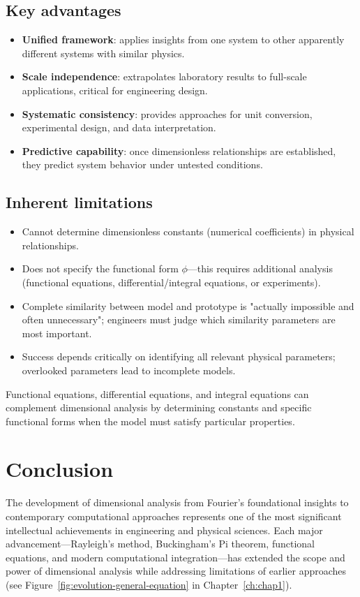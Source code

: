 \subsection{Key advantages}
\begin{itemize}
\item \textbf{Unified framework}: applies insights from one system to other apparently different systems with similar physics.
\item \textbf{Scale independence}: extrapolates laboratory results to full-scale applications, critical for engineering design.
\item \textbf{Systematic consistency}: provides approaches for unit conversion, experimental design, and data interpretation.
\item \textbf{Predictive capability}: once dimensionless relationships are established, they predict system behavior under untested conditions.
\end{itemize}

\subsection{Inherent limitations}
\begin{itemize}
\item Cannot determine dimensionless constants (numerical coefficients) in physical relationships.
\item Does not specify the functional form \(\phi\)—this requires additional analysis (functional equations, differential/integral equations, or experiments).
\item Complete similarity between model and prototype is "actually impossible and often unnecessary"; engineers must judge which similarity parameters are most important.
\item Success depends critically on identifying all relevant physical parameters; overlooked parameters lead to incomplete models.
\end{itemize}
Functional equations, differential equations, and integral equations can complement dimensional analysis by determining constants and specific functional forms when the model must satisfy particular properties.

\section{Conclusion}

The development of dimensional analysis from Fourier's foundational insights to contemporary computational approaches represents one of the most significant intellectual achievements in engineering and physical sciences. Each major advancement—Rayleigh's method, Buckingham's Pi theorem, functional equations, and modern computational integration—has extended the scope and power of dimensional analysis while addressing limitations of earlier approaches (see Figure~\ref{fig:evolution-general-equation} in Chapter~\ref{ch:chap1}).

